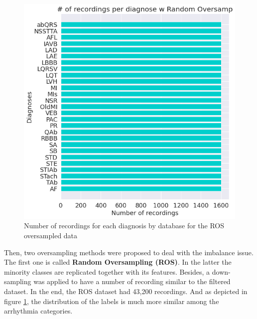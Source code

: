 \begin{figure}[H]
\centering
\includegraphics[scale=0.4]{img/label_distro_ros.png}
\caption{Number of recordings for each diagnosis by database for the ROS oversampled data}
\label{fig:label_distro_ros}
\end{figure}

Then, two oversampling methods were proposed to deal with the imbalance issue. The first one is called \textbf{Random Oversampling (ROS)}. In the latter the minority classes are replicated together with its features. Besides, a down-sampling was applied to have a number of recording similar to the filtered dataset. In the end, the ROS dataset had 43,200 recordings. And as depicted in figure \ref{fig:label_distro_ros}, the distribution of the labels is much more similar among the arrhythmia categories.

